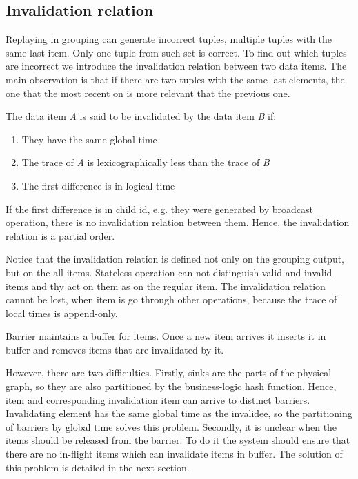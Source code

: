 \subsection{Invalidation relation}

Replaying in grouping can generate incorrect tuples, multiple tuples with the same last item. Only one tuple from such set is correct. To find out which tuples are incorrect we introduce the invalidation relation between two data items. The main observation is that if there are two tuples with the same last elements, the one that the most recent on is more relevant that the previous one. 

The data item {\it A} is said to be invalidated by the data item {\it B} if:

\begin{enumerate}
\item They have the same global time
\item The trace of {\it A} is lexicographically less than the trace of {\it B}
\item The first difference is in logical time
\end{enumerate}

If the first difference is in child id, e.g. they were generated by broadcast operation, there is no invalidation relation between them. Hence, the invalidation relation is a partial order. 

Notice that the invalidation relation is defined not only on the grouping output, but on the all items. Stateless operation can not distinguish valid and invalid items and thy act on them as on the regular item. The invalidation relation cannot be lost, when item is go through other operations, because the trace of local times is append-only.

Barrier maintains a buffer for items. Once a new item arrives it inserts it in buffer and removes items that are invalidated by it.

However, there are two difficulties. Firstly, sinks are the parts of the physical graph, so they are also partitioned by the business-logic hash function. Hence, item and corresponding invalidation item can arrive to distinct barriers. Invalidating element has the same global time as the invalidee, so the partitioning of barriers by global time solves this problem. Secondly, it is unclear when the items should be released from the barrier. To do it the system should ensure that there are no in-flight items which can invalidate items in buffer. The solution of this problem is detailed in the next section. 

